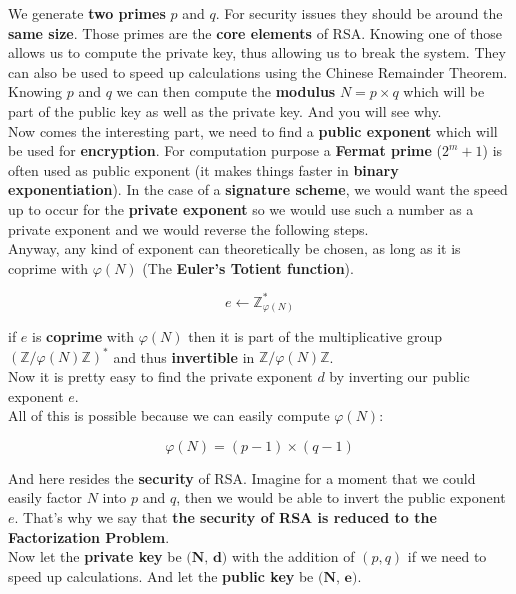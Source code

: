 \documentclass[a4paper,11pt]{article}
\begin{document}
We generate \textbf{two primes} $p$ and $q$. For security issues they should be around the \textbf{same size}. Those primes are the \textbf{core elements} of RSA. Knowing one of those allows us to compute the private key, thus allowing us to break the system. They can also be used to speed up calculations using the Chinese Remainder Theorem.\\
Knowing $p$ and $q$ we can then compute the \textbf{modulus} $N = p \times q$ which will be part of the public key as well as the private key. And you will see why.\\

Now comes the interesting part, we need to find a \textbf{public exponent} which will be used for \textbf{encryption}. For computation purpose a \textbf{Fermat prime} ($2^{m} + 1$) is often used as public exponent (it makes things faster in \textbf{binary exponentiation}). In the case of a \textbf{signature scheme}, we would want the speed up to occur for the \textbf{private exponent} so we would use such a number as a private exponent and we would reverse the following steps.\\
Anyway, any kind of exponent can theoretically be chosen, as long as it is coprime with $\varphi(N)$ (The \textbf{Euler's Totient function}).

\[e \leftarrow \mathbb{Z}_{\varphi(N)}^{\ast}\]

if $e$ is \textbf{coprime} with $\varphi(N)$ then it is part of the multiplicative group $(\mathbb{Z}/\varphi(N)\mathbb{Z})^{\ast}$ and thus \textbf{invertible} in $\mathbb{Z}/\varphi(N)\mathbb{Z}$.\\

Now it is pretty easy to find the private exponent $d$ by inverting our public exponent $e$.\\

All of this is possible because we can easily compute $\varphi(N)$:

\[\varphi(N) = (p - 1) \times (q - 1)\]

And here resides the \textbf{security} of RSA. Imagine for a moment that we could easily factor $N$ into $p$ and $q$, then we would be able to invert the public exponent $e$. That's why we say that \textbf{the security of RSA is reduced to the Factorization Problem}.\\

Now let the \textbf{private key} be $\textbf{(N, d)}$ with the addition of $(p, q)$ if we need to speed up calculations.
And let the \textbf{public key} be $\textbf{(N, e)}$.
\end{document}
